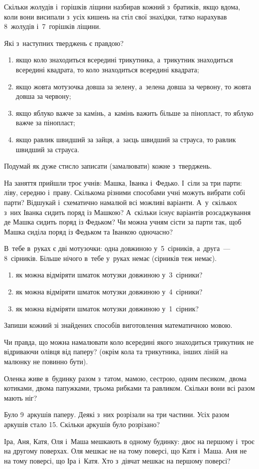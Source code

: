 Скільки жолудів і~горішків ліщини назбирав кожний з~братиків,
якщо вдома, коли вони висипали з~усіх кишень на стіл свої знахідки,
татко нарахував 8~жолудів і~7~горішків ліщини.


\problem
Які з~наступних тверджень є правдою?
\begin{enumerate}
    \item якщо коло знаходиться всередині трикутника,
    а~трикутник знаходиться всередині квадрата,
    то коло знаходиться всередині квадрата;
    \item якщо жовта мотузочка довша за зелену,
    а~зелена довша за червону, то жовта довша за червону;
    \item якщо яблуко важче за камінь, а~камінь важить більше за пінопласт,
    то яблуко важче за пінопласт;
    \item якщо равлик швидший за зайця, а~заєць швидший за страуса,
    то равлик швидший за страуса.
\end{enumerate}
Подумай як дуже стисло записати (замалювати) кожне з~тверджень.


\problem
На заняття прийшли троє учнів: Машка, Іванка і~Федько.
І~сіли за три парти: ліву, середню і~праву.
Скількома різними способами учні можуть вибрати собі парти?
Відшукай і~схематично намалюй всі можливі варіанти.
А~у~скількох з~них Іванка сидить поряд із Машкою?
А~скільки існує варіантів розсаджування де Машка сидить поряд із Федьком?
Чи можна учням сісти за парти так,
щоб Машка сиділа поряд із Федьком та Іванкою одночасно?



\problem
В~тебе в~руках є дві мотузочки:
одна довжиною у~5~сірників, а~друга~--- 8~сірників.
Більше нічого в~тебе у~руках немає (сірників теж немає).
\begin{enumerate}
    \item як можна відміряти шматок мотузки довжиною у~3~сірники?
    \item як можна відміряти шматок мотузки довжиною у~4~сірники?
    \item як можна відміряти шматок мотузки довжиною у~1~сірник?
\end{enumerate}
Запиши кожний зі знайдених способів виготовлення математичною мовою.


\problem
Чи правда, що можна намалювати коло всередині якого знаходиться
трикутник не відриваючи олівця від паперу?
(окрім кола та трикутника, інших ліній на малюнку не повинно бути).


\problem
Оленка живе в~будинку разом з~татом, мамою, сестрою, одним песиком,
двома котиками, двома папужками, трьома рибками та равликом.
Скільки вони всі разом мають ніг?


\problem
Було 9~аркушів паперу. Деякі з~них розрізали на три частини.
Усіх разом аркушів стало 15.
Скільки аркушів було розрізано?


\problem
Іра, Аня, Катя, Оля і~Маша мешкають в одному будинку:
двоє на першому і~троє на другому поверхах.
Оля мешкає не на тому поверсі, що Катя і~Маша.
Аня не на тому поверсі, що Іра і~Катя.
Хто з~дівчат мешкає на першому поверсі?

